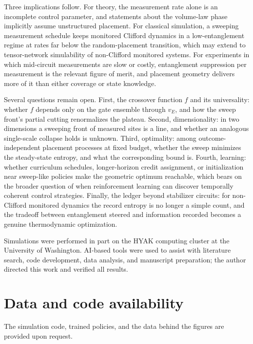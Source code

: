 \documentclass[aps,prb,twocolumn,superscriptaddress,nofootinbib]{revtex4-2}
\begin{document}
Three implications follow. For theory, the measurement rate alone is an
incomplete control parameter, and statements about the volume-law phase
implicitly assume unstructured placement. For classical simulation, a
sweeping measurement schedule keeps monitored Clifford dynamics in a
low-entanglement regime at rates far below the random-placement
transition, which may extend to tensor-network simulability of
non-Clifford monitored systems. For experiments in which mid-circuit
measurements are slow or costly, entanglement suppression per measurement
is the relevant figure of merit, and placement geometry delivers more of
it than either coverage or state knowledge.

Several questions remain open. First, the crossover function $f$ and its
universality: whether $f$ depends only on the gate ensemble through
$v_E$, and how the sweep front's partial cutting renormalizes the plateau.
Second, dimensionality: in two dimensions a sweeping front of measured
sites is a line, and whether an analogous single-scale collapse holds is
unknown. Third, optimality: among outcome-independent placement processes
at fixed budget, whether the sweep minimizes the steady-state entropy, and
what the corresponding bound is. Fourth, learning: whether curriculum
schedules, longer-horizon credit assignment, or initialization near
sweep-like policies make the geometric optimum reachable, which bears on
the broader question of when reinforcement learning can discover
temporally coherent control strategies. Finally, the ledger beyond
stabilizer circuits: for non-Clifford monitored dynamics the record
entropy is no longer a simple count, and the tradeoff between entanglement
steered and information recorded becomes a genuine thermodynamic
optimization.

\begin{acknowledgments}
Simulations were performed in part on the HYAK computing cluster at the
University of Washington. AI-based tools were used to assist with
literature search, code development, data analysis, and manuscript
preparation; the author directed this work and verified all results.
\end{acknowledgments}

\section*{Data and code availability}
The simulation code, trained policies, and the data behind the figures
are provided upon request.
\end{document}
